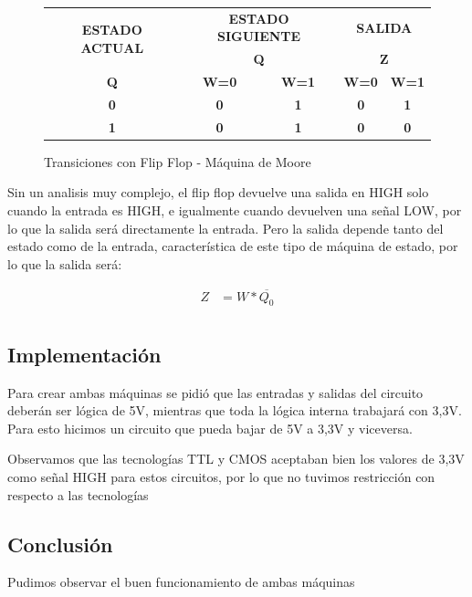 \documentclass[10pt,a4paper]{article}
\begin{document}
\begin{figure}[H]
	\begin{center}
		\begin{tabular}{|c|c|c|c|c|}
\hline
\multirow{2}{*}{\textbf{ESTADO ACTUAL}} & \multicolumn{2}{c|}{\textbf{ESTADO SIGUIENTE}} & \multicolumn{2}{c|}{\textbf{SALIDA}} \\ \cline{2-5} 
 & \multicolumn{2}{c|}{\textbf{Q}} & \multicolumn{2}{c|}{\textbf{Z}} \\ \hline
\textbf{Q} & \textbf{W=0} & \textbf{W=1} & \textbf{W=0} & \textbf{W=1} \\ \hline
\textbf{0} & \textbf{0} & \textbf{1} & \textbf{0} & \textbf{1} \\ \hline
\textbf{1} & \textbf{0} & \textbf{1} & \textbf{0} & \textbf{0} \\ \hline
		\end{tabular}
		\caption{Transiciones con Flip Flop - Máquina de Moore} 
		\label{3_fig8}
	\end{center}
\end{figure}

Sin un analisis muy complejo, el flip flop devuelve una salida en HIGH solo cuando la entrada es HIGH, e igualmente cuando devuelven una señal LOW, por lo que la salida será directamente la entrada. Pero la salida depende tanto del estado como de la entrada, característica de este tipo de máquina de estado, por lo que la salida será:

\begin{align*}
	Z &= W * \overline{Q_{0}} \\
\end{align*}


\subsection{Implementación}
Para crear ambas máquinas se pidió que las entradas y salidas del circuito deberán ser lógica de 5V, mientras que toda la lógica interna trabajará con 3,3V. Para esto hicimos un circuito que pueda bajar de 5V a 3,3V y viceversa.

Observamos que las tecnologías TTL y CMOS aceptaban bien los valores de 3,3V como señal HIGH para estos circuitos, por lo que no tuvimos restricción con respecto a las tecnologías
\subsection{Conclusión}
Pudimos observar el buen funcionamiento de ambas máquinas
\end{document}
